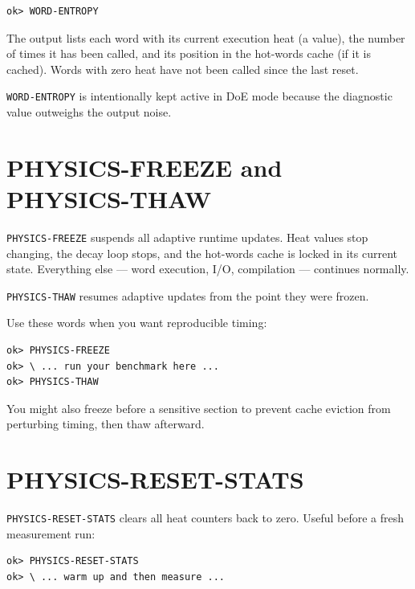 \begin{lstlisting}[language=Forth]
ok> WORD-ENTROPY
\end{lstlisting}

The output lists each word with its current execution heat (a \Qtype{} value),
the number of times it has been called, and its position in the hot-words
cache (if it is cached). Words with zero heat have not been called since the
last reset.

\texttt{WORD-ENTROPY} is intentionally kept active in DoE mode because the
diagnostic value outweighs the output noise.

\section{PHYSICS-FREEZE and PHYSICS-THAW}
\label{sec:freeze-thaw}

\texttt{PHYSICS-FREEZE} suspends all adaptive runtime updates. Heat values stop
changing, the decay loop stops, and the hot-words cache is locked in its
current state. Everything else --- word execution, I/O, compilation --- continues
normally.

\texttt{PHYSICS-THAW} resumes adaptive updates from the point they were frozen.

Use these words when you want reproducible timing:

\begin{lstlisting}[language=Forth]
ok> PHYSICS-FREEZE
ok> \ ... run your benchmark here ...
ok> PHYSICS-THAW
\end{lstlisting}

You might also freeze before a sensitive section to prevent cache eviction
from perturbing timing, then thaw afterward.

\section{PHYSICS-RESET-STATS}
\label{sec:physics-reset}

\texttt{PHYSICS-RESET-STATS} clears all heat counters back to zero. Useful
before a fresh measurement run:

\begin{lstlisting}[language=Forth]
ok> PHYSICS-RESET-STATS
ok> \ ... warm up and then measure ...
\end{lstlisting}

